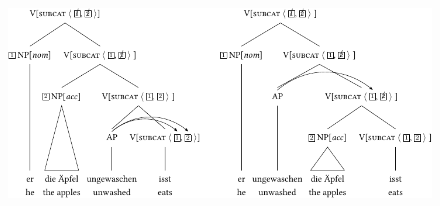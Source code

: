\begin{figure}
\includegraphics[width=\textwidth]{Figures/depictives-lsp-cropped.pdf}

\end{figure}
